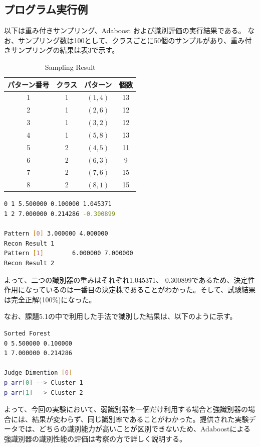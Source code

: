 \documentclass[ %
  uplatex,%
  papersize%
]{jsarticle}
\begin{document}
\subsection{プログラム実行例}
以下は重み付きサンプリング、Adaboost および識別評価の実行結果である。
なお、サンプリング数は100として、クラスごとに50個のサンプルがあり、重み付きサンプリングの結果は表3で示す。

\begin{table}[h]\footnotesize
\caption{Sampling Result}
\label{}
\centering
\begin{tabular}{|c|c|c|c|}
\hline
パターン番号&クラス&パターン&個数\\
\hline
1 & 1 &$(1, 4)$ &13\\
\hline
2 & 1 &$(2, 6)$ &12\\
\hline
3 & 1 &$(3, 2)$ &12\\
\hline
4 & 1 &$(5, 8)$ &13\\
\hline
5 & 2 &$(4, 5)$ &11\\
\hline
6 & 2 &$(6, 3)$ &9\\
\hline
7 & 2 &$(7, 6)$ &15\\
\hline
8 & 2 &$(8, 1)$ &15\\
\hline
\end{tabular} 
\end{table}

\begin{lstlisting}[language=bash,caption=Adaboost and Recognition]
0 1 5.500000 0.100000 1.045371
1 2 7.000000 0.214286 -0.300899

Pattern [0]	3.000000 4.000000
Recon Result 1
Pattern [1]	       6.000000 7.000000
Recon Result 2
\end{lstlisting}

よって、二つの識別器の重みはそれぞれ1.045371、-0.300899であるため、決定性作用になっているのは一番目の決定株であることがわかった。そして、試験結果は完全正解(100\%)になった。

なお、課題5.1の中で利用した手法で識別した結果は、以下のように示す。

\begin{lstlisting}[language=bash,caption=Decetion Stump Result]
Sorted Forest
0 5.500000 0.100000
1 7.000000 0.214286

Judge Dimention [0]
p_arr[0] --> Cluster 1 
p_arr[1] --> Cluster 2 
\end{lstlisting}

よって、今回の実験において、弱識別器を一個だけ利用する場合と強識別器の場合には、結果が変わらず、同じ識別率であることがわかった。提供された実験データでは、どちらの識別能力が高いことが区別できないため、Adaboostによる強識別器の識別性能の評価は考察の方で詳しく説明する。
\end{document}
